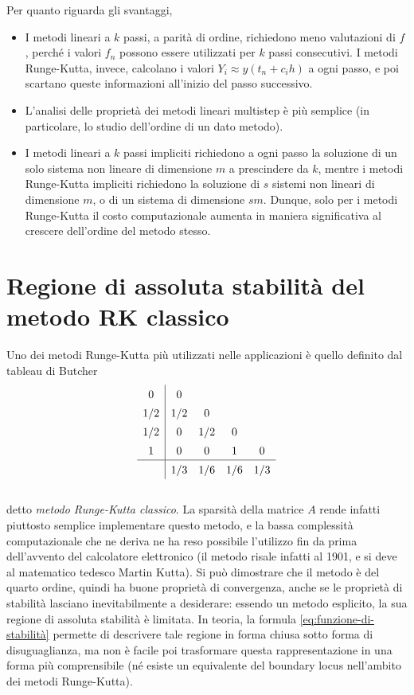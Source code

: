 Per quanto riguarda gli svantaggi,
\begin{itemize}
\item I metodi lineari a $k$ passi, a parità di ordine, richiedono meno
valutazioni di $f$, perché i valori $f_n$ possono essere utilizzati per $k$
passi consecutivi. I metodi Runge-Kutta, invece, calcolano i valori
$Y_i \approx y(t_n+c_i h)$ a ogni passo, e poi scartano queste informazioni
all'inizio del passo successivo.
\item L'analisi delle proprietà dei metodi lineari multistep è più semplice
(in particolare, lo studio dell'ordine di un dato metodo).
\item I metodi lineari a $k$ passi impliciti richiedono a ogni passo
la soluzione di un solo sistema non lineare di dimensione $m$ a prescindere
da $k$, mentre i metodi Runge-Kutta impliciti richiedono la soluzione di $s$
sistemi non lineari di dimensione $m$, o di un sistema di dimensione $sm$.
Dunque, solo per i metodi Runge-Kutta il costo computazionale aumenta in maniera
significativa al crescere dell'ordine del metodo stesso.
\end{itemize}

\section{Regione di assoluta stabilità del metodo RK classico}

Uno dei metodi Runge-Kutta più utilizzati nelle applicazioni è quello
definito dal tableau di Butcher
\[
\renewcommand\arraystretch{1.4}
\begin{array}
{c|cccc}
0   & 0   &     &   &   \\
1/2 & 1/2 & 0   &   &   \\
1/2 & 0   & 1/2 & 0 &   \\
1   & 0   & 0   & 1 & 0 \\
\hline
    & 1/3 & 1/6 & 1/6 & 1/3 \\
\end{array}
\]
\\
detto \emph{metodo Runge-Kutta classico}. La sparsità della matrice $A$
rende infatti piuttosto semplice implementare questo metodo, e la bassa
complessità computazionale che ne deriva ne ha reso possibile l'utilizzo
fin da prima dell'avvento del calcolatore elettronico (il metodo risale infatti
al 1901, e si deve al matematico tedesco Martin Kutta).
Si può dimostrare che il metodo è del quarto ordine, quindi ha buone proprietà
di convergenza, anche se le proprietà di stabilità lasciano inevitabilmente
a desiderare: essendo un metodo esplicito, la sua regione di assoluta stabilità
è limitata. In teoria, la formula \eqref{eq:funzione-di-stabilità} permette
di descrivere tale regione in forma chiusa sotto forma di disuguaglianza,
ma non è facile poi trasformare questa rappresentazione in una forma più
comprensibile (né esiste un equivalente del boundary locus nell'ambito dei
metodi Runge-Kutta).

